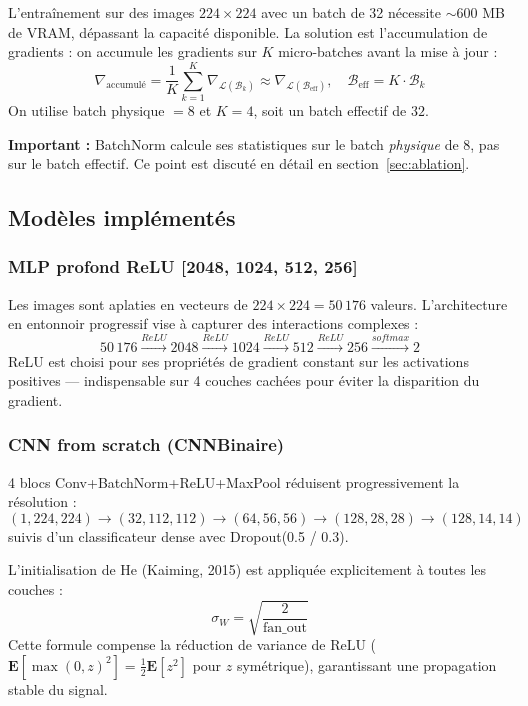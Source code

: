 \documentclass[a4paper,11pt]{article}
\begin{document}
L'entraînement sur des images $224\times224$ avec un batch de 32 nécessite
$\sim$600 MB de VRAM, dépassant la capacité disponible. La solution est l'accumulation
de gradients : on accumule les gradients sur $K$ micro-batches avant la mise à jour :
\[
  \nabla_{\text{accumulé}} = \frac{1}{K}\sum_{k=1}^{K} \nabla_{\mathcal{L}(\mathcal{B}_k)}
  \approx \nabla_{\mathcal{L}(\mathcal{B}_{\text{eff}})}, \quad
  \mathcal{B}_{\text{eff}} = K \cdot \mathcal{B}_k
\]
On utilise batch physique $= 8$ et $K = 4$, soit un batch effectif de $32$.

\textbf{Important :} BatchNorm calcule ses statistiques sur le batch \emph{physique} de 8,
pas sur le batch effectif. Ce point est discuté en détail en section~\ref{sec:ablation}.

\subsection{Modèles implémentés}

\subsubsection*{MLP profond ReLU [2048, 1024, 512, 256]}

Les images sont aplaties en vecteurs de $224\times224 = 50\,176$ valeurs.
L'architecture en entonnoir progressif vise à capturer des interactions complexes :
\[
  50\,176 \xrightarrow{ReLU} 2048 \xrightarrow{ReLU} 1024
  \xrightarrow{ReLU} 512 \xrightarrow{ReLU} 256 \xrightarrow{softmax} 2
\]
ReLU est choisi pour ses propriétés de gradient constant sur les activations positives —
indispensable sur 4 couches cachées pour éviter la disparition du gradient.

\subsubsection*{CNN from scratch (CNNBinaire)}

4 blocs Conv+BatchNorm+ReLU+MaxPool réduisent progressivement la résolution :
\[
  (1,224,224) \to (32,112,112) \to (64,56,56) \to (128,28,28) \to (128,14,14)
\]
suivis d'un classificateur dense avec Dropout(0.5 / 0.3).

L'initialisation de He (Kaiming, 2015) est appliquée explicitement à toutes les couches :
\[
  \sigma_W = \sqrt{\frac{2}{\text{fan\_out}}}
\]
Cette formule compense la réduction de variance de ReLU ($\mathbf{E}[\max(0,z)^2] = \frac{1}{2}\mathbf{E}[z^2]$
pour $z$ symétrique), garantissant une propagation stable du signal.
\end{document}
